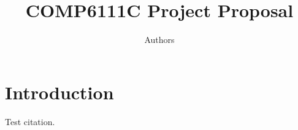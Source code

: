 \documentclass{article}
\title{COMP6111C Project Proposal}
\author{Authors}
\date{}
\begin{document}
\maketitle


\section{Introduction}

Test citation\cite{Meiklejohn:2013:FBC:2504730.2504747}.
     
\newpage


\end{document}
